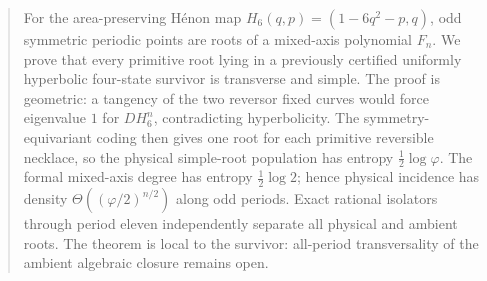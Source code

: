 \begin{abstract}
For the area-preserving H\'enon map
$H_6(q,p)=(1-6q^2-p,q)$, odd symmetric periodic points are roots of a
mixed-axis polynomial $F_n$.  We prove that every primitive root lying in a
previously certified uniformly hyperbolic four-state survivor is transverse
and simple.  The proof is geometric: a tangency of the two reversor fixed
curves would force eigenvalue $1$ for $DH_6^n$, contradicting hyperbolicity.
The symmetry-equivariant coding then gives one root for each primitive
reversible necklace, so the physical simple-root population has entropy
$\frac12\log\varphi$.  The formal mixed-axis degree has entropy
$\frac12\log2$; hence physical incidence has density
$\Theta((\varphi/2)^{n/2})$ along odd periods.  Exact rational isolators
through period eleven independently separate all physical and ambient roots.
The theorem is local to the survivor: all-period transversality of the
ambient algebraic closure remains open.
\end{abstract}
